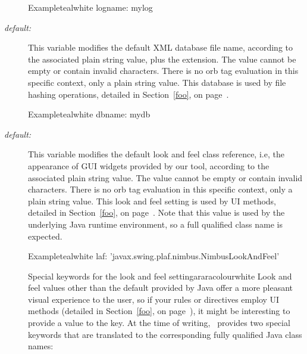 \begin{description}
\begin{codebox}{Example}{teal}{\icnote}{white}
logname: mylog
\end{codebox}

\item[\describecf{O}{string}{dbname}\hfill {\normalfont\itshape default:} \rbox{arara}] This variable modifies the default XML database file name, according to the associated plain string value, plus the  extension. The value cannot be empty or contain invalid characters. There is no orb tag evaluation in this specific context, only a plain string value. This database is used by file hashing operations, detailed in Section~\ref{foo}, on page~\pageref{foo}.

\begin{codebox}{Example}{teal}{\icnote}{white}
dbname: mydb
\end{codebox}

\item[\describecf{O}{string}{laf}\hfill {\normalfont\itshape default:} \rbox{none}] This variable modifies the default look and feel class reference, i.e,  the appearance of GUI widgets provided by our tool, according to the associated plain string value. The value cannot be empty or contain invalid characters. There is no orb tag evaluation in this specific context, only a plain string value. This look and feel setting is used by UI methods, detailed in Section~\ref{foo}, on page~\pageref{foo}. Note that this value is used by the underlying Java runtime environment, so a full qualified class name is expected.

\begin{codebox}{Example}{teal}{\icnote}{white}
laf: 'javax.swing.plaf.nimbus.NimbusLookAndFeel'
\end{codebox}

\begin{messagebox}{Special keywords for the look and feel setting}{araracolour}{\icok}{white}
Look and feel values other than the default provided by Java offer a more pleasant visual experience to the user, so if your rules or directives employ UI methods (detailed in Section~\ref{foo}, on page~\pageref{foo}), it might be interesting to provide a value to the  key. At the time of writing, \arara\ provides two special keywords that are translated to the corresponding fully qualified Java class names:

\vspace{1em}


\end{messagebox}
\end{description}

